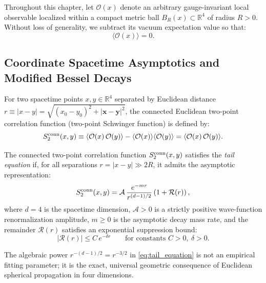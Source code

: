 Throughout this chapter, let $\mathcal{O}(x)$ denote an arbitrary gauge-invariant local observable localized within a compact metric ball $B_R(x) \subset \mathbb{R}^4$ of radius $R > 0$. Without loss of generality, we subtract its vacuum expectation value so that:
\begin{equation}
\label{eq:vev_vanishing}
\langle \mathcal{O}(x) \rangle = 0.
\end{equation}

\subsection{Coordinate Spacetime Asymptotics and Modified Bessel Decays}
\label{subsec:coordinate_asymptotics}

For two spacetime points $x, y \in \mathbb{R}^4$ separated by Euclidean distance $r \equiv |x - y| = \sqrt{(x_0 - y_0)^2 + |\mathbf{x} - \mathbf{y}|^2}$, the connected Euclidean two-point correlation function (two-point Schwinger function) is defined by:
\begin{equation}
\label{eq:schwinger_2pt_def}
S_2^{\mathrm{conn}}(x, y) \equiv \langle \mathcal{O}(x) \, \mathcal{O}(y) \rangle - \langle \mathcal{O}(x) \rangle \langle \mathcal{O}(y) \rangle = \langle \mathcal{O}(x) \, \mathcal{O}(y) \rangle.
\end{equation}

\begin{definition}
\label{def:tail_equation}
The connected two-point correlation function $S_2^{\mathrm{conn}}(x, y)$ satisfies the \emph{tail equation} if, for all separations $r = |x - y| \gg 2R$, it admits the asymptotic representation:
\begin{equation}
\label{eq:tail_equation}
S_2^{\mathrm{conn}}(x, y) = \mathcal{A} \, \frac{e^{-m r}}{r^{(d-1)/2}} \left( 1 + \mathcal{R}(r) \right),
\end{equation}
where $d = 4$ is the spacetime dimension, $\mathcal{A} > 0$ is a strictly positive wave-function renormalization amplitude, $m \ge 0$ is the asymptotic decay mass rate, and the remainder $\mathcal{R}(r)$ satisfies an exponential suppression bound:
\begin{equation}
\label{eq:tail_remainder_bound}
|\mathcal{R}(r)| \le C \, e^{-\delta r} \qquad \text{for constants } C > 0, \ \delta > 0.
\end{equation}
\end{definition}

The algebraic power $r^{-(d-1)/2} = r^{-3/2}$ in \eqref{eq:tail_equation} is not an empirical fitting parameter; it is the exact, universal geometric consequence of Euclidean spherical propagation in four dimensions. 

